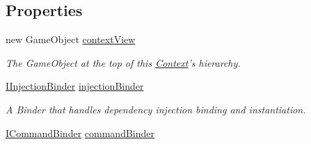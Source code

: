 \subsection*{Properties}
\begin{DoxyCompactItemize}
\item 
\hypertarget{classstrange_1_1extensions_1_1context_1_1impl_1_1_m_v_c_s_context_afb13dd1186e389d0f0a44338477bcb1c}{new Game\-Object \hyperlink{classstrange_1_1extensions_1_1context_1_1impl_1_1_m_v_c_s_context_afb13dd1186e389d0f0a44338477bcb1c}{context\-View}}\label{classstrange_1_1extensions_1_1context_1_1impl_1_1_m_v_c_s_context_afb13dd1186e389d0f0a44338477bcb1c}

\begin{DoxyCompactList}\small\item\em The Game\-Object at the top of this \hyperlink{classstrange_1_1extensions_1_1context_1_1impl_1_1_context}{Context}'s hierarchy. \end{DoxyCompactList}\item 
\hypertarget{classstrange_1_1extensions_1_1context_1_1impl_1_1_m_v_c_s_context_afe136a86f154ed170eb60fb655b18548}{\hyperlink{interfacestrange_1_1extensions_1_1injector_1_1api_1_1_i_injection_binder}{I\-Injection\-Binder} \hyperlink{classstrange_1_1extensions_1_1context_1_1impl_1_1_m_v_c_s_context_afe136a86f154ed170eb60fb655b18548}{injection\-Binder}}\label{classstrange_1_1extensions_1_1context_1_1impl_1_1_m_v_c_s_context_afe136a86f154ed170eb60fb655b18548}

\begin{DoxyCompactList}\small\item\em A Binder that handles dependency injection binding and instantiation. \end{DoxyCompactList}\item 
\hypertarget{classstrange_1_1extensions_1_1context_1_1impl_1_1_m_v_c_s_context_a7100de9c1148ef6c3300b8e608d0ed00}{\hyperlink{interfacestrange_1_1extensions_1_1command_1_1api_1_1_i_command_binder}{I\-Command\-Binder} \hyperlink{classstrange_1_1extensions_1_1context_1_1impl_1_1_m_v_c_s_context_a7100de9c1148ef6c3300b8e608d0ed00}{command\-Binder}}\label{classstrange_1_1extensions_1_1context_1_1impl_1_1_m_v_c_s_context_a7100de9c1148ef6c3300b8e608d0ed00}


\end{DoxyCompactItemize}
